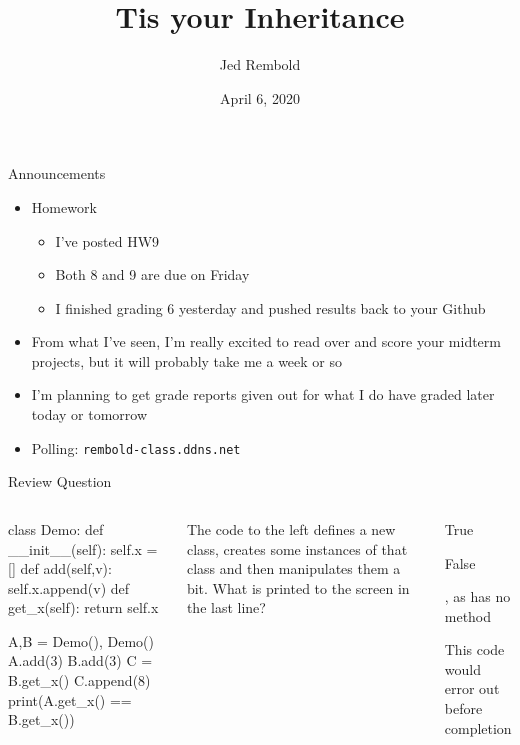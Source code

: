 \documentclass[pdf, aspectratio=169, 12pt]{beamer}
\title{Tis your Inheritance}
\author{Jed Rembold}
\date{April 6, 2020}
\begin{document}
\begin{frame}{Announcements}
	\begin{itemize}
		\item Homework
			\begin{itemize}
				\item I've posted HW9
				\item Both 8 and 9 are due on Friday
				\item I finished grading 6 yesterday and pushed results back to your Github
			\end{itemize}
		\item From what I've seen, I'm really excited to read over and score your midterm projects, but it will probably take me a week or so
		\item I'm planning to get grade reports given out for what I do have graded later today or tomorrow
		\item Polling: \nolinkurl{rembold-class.ddns.net}
	\end{itemize}
\end{frame}

\begin{frame}[fragile]{Review Question}
	\begin{columns}
		\small
		\begin{pythoncode}
			class Demo:
				def __init__(self):
					self.x = []
				def add(self,v):
					self.x.append(v)
				def get_x(self):
					return self.x

			A,B = Demo(), Demo()
			A.add(3)
			B.add(3)
			C = B.get_x()
			C.append(8)
			print(A.get_x() == B.get_x())
		\end{pythoncode}
		The code to the left defines a new class, creates some instances of that class and then manipulates them a bit. What is printed to the screen in the last line?
		\begin{poll}
		\item True
		\item False
		\item {}, as  has no  method
		\item This code would error out before completion
		\end{poll}
		
	\end{columns}
\end{frame}
\end{document}
